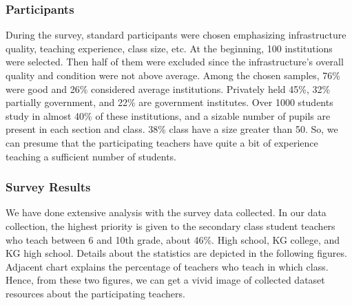 \documentclass[sn-mathphys,Numbered]{sn-jnl}%
\theoremstyle{thmstyleone}%
\theoremstyle{thmstyletwo}%
\theoremstyle{thmstylethree}%
\begin{document}
\subsubsection{Participants} During the survey, standard participants were chosen emphasizing infrastructure quality, teaching experience, class size, etc. At the beginning, 100 institutions were selected. Then half of them were excluded since the infrastructure's overall quality and condition were not above average. Among the chosen samples, 76\% were good and 26\% considered average institutions. Privately held 45\%, 32\% partially government, and 22\% are government institutes. Over 1000 students study in almost 40\% of these institutions, and a sizable number of pupils are present in each section and class. 38\% class have a size greater than 50. So, we can presume that the participating teachers have quite a bit of experience teaching a sufficient number of students. 

\subsubsection{Survey Results} We have done extensive analysis with the survey data collected. In our data collection, the highest priority is given to the secondary class student teachers who teach between 6 and 10th grade, about 46\%. High school, KG college, and KG high school. Details about the statistics are depicted in the following figures. Adjacent chart explains the percentage of teachers who teach in which class. Hence, from these two figures, we can get a vivid image of collected dataset resources about the participating teachers.
\end{document}
